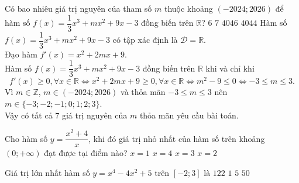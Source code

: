 \begin{ex}%
Có bao nhiêu giá trị nguyên của tham số $m$ thuộc khoảng $(-2024; 2026)$ để hàm số $f(x)=\dfrac{1}{3}x^3+mx^2+9x-3$ đồng biến trên $\mathbb{R}$?
\choice
{$6$}
{\True $7$}
{$4046$}
{$4044$}
\loigiai
{
Hàm số $f(x)=\dfrac{1}{3}x^3+mx^2+9x-3$ có tập xác định là $\mathscr{D} = \mathbb{R}$.\\
Đạo hàm $f'(x) = x^2+2mx+9$.\\
Hàm số $f(x)=\dfrac{1}{3}x^3+mx^2+9x-3$ đồng biến trên $\mathbb{R}$ khi và chỉ khi
\[f'(x)\geq 0, \forall x\in\mathbb{R} \Leftrightarrow x^2+2mx+9\geq 0, \forall x\in \mathbb{R} \Leftrightarrow m^2-9\leq 0 \Leftrightarrow -3\leq m\leq 3.\]
Vì $m\in\mathbb{Z}$, $m\in (-2024;2026)$ và thỏa mãn $-3\leq m\leq 3$ nên $m\in \{-3;-2;-1;0;1;2;3\}$.\\
Vậy có tất cả $7$ giá trị nguyên của $m$ thỏa mãn yêu cầu bài toán.
}
\end{ex}
\begin{ex}%
Cho hàm số $y=\dfrac{x^2+4}{x}$, khi đó giá trị nhỏ nhất của hàm số trên khoảng $\left(0;+\infty\right)$ đạt được tại điểm nào? 
\choice
{$x=1$}
{$x=4$}
{$x=3$}
{\True $x=2$}
\end{ex}

\begin{ex}%
Giá trị lớn nhất hàm số $y=x^4-4x^2+5$ trên $\left[-2;3\right]$ là
\choice
{$122$}
{$1$}
{$5$}
{\True $50$}
\end{ex}

